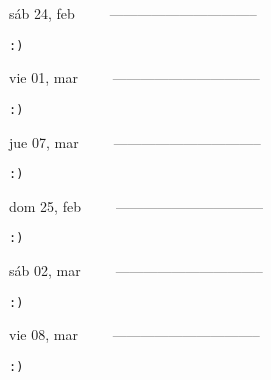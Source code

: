 \documentclass[letterpaper,10pt]{article}
\begin{document}
\begin{multicols}{3}
{sáb 24, feb\ \ \ \ \ --------------------------------}
\begin{flushright}\begin{small}\texttt{:)}\end{small}\end{flushright}
\vfill
{vie 01, mar\ \ \ \ \ --------------------------------}
\begin{flushright}\begin{small}\texttt{:)}\end{small}\end{flushright}\par
\vfill
{jue 07, mar\ \ \ \ \ --------------------------------}
\begin{flushright}\begin{small}\texttt{:)}\end{small}\end{flushright}\par
\vfill
\end{multicols}
\vspace{1.05cm}

\begin{multicols}{3}
{dom 25, feb\ \ \ \ \ --------------------------------}
\begin{flushright}\begin{small}\texttt{:)}\end{small}\end{flushright}
\vfill
{sáb 02, mar\ \ \ \ \ --------------------------------}
\begin{flushright}\begin{small}\texttt{:)}\end{small}\end{flushright}\par
\vfill
{vie 08, mar\ \ \ \ \ --------------------------------}
\begin{flushright}\begin{small}\texttt{:)}\end{small}\end{flushright}\par
\vfill
\end{multicols}
\vspace{1.05cm}
\end{document}
